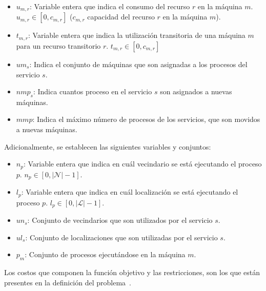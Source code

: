 \documentclass[../informe2.tex]{subfiles}
\begin{document}
\begin{itemize}
	\item $u_{m,r}$: Variable entera que indica el consumo del recurso $r$ en la máquina $m$. $u_{m,r} \in [0,c_{m,r}]$ ($c_{m,r}$ capacidad del recurso $r$ en la máquina $m$).
	\item $t_{m,r}$: Variable entera que indica la utilización transitoria de una máquina $m$ para un recurso transitorio $r$. $t_{m,r} \in [0,c_{m,r}]$
	\item $um_s$: Indica el conjunto de máquinas que son asignadas a los procesos del servicio $s$.
	\item $nmp_s$: Indica cuantos proceso en el servicio $s$ son asignados a nuevas máquinas.
	\item $mmp$: Indica el máximo número de procesos de los servicios, que son movidos a nuevas máquinas.
\end{itemize}
Adicionalmente, se establecen las siguientes variables y conjuntos:
\begin{itemize}
	\item $n_p$: Variable entera que indica en cuál vecindario se está ejecutando el proceso $p$. $n_p \in [0,|\mathcal{N}|-1]$.
	\item $l_p$: Variable entera que indica en cuál localización se está ejecutando el proceso $p$. $l_p \in [0,|\mathcal{L}|-1]$.
	\item $un_s$: Conjunto de vecindarios que son utilizados por el servicio $s$.
	\item $ul_s$: Conjunto de localizaciones que son utilizadas por el servicio $s$.
	\item $p_m$: Conjunto de procesos ejecutándose en la máquina $m$.
\end{itemize}
Los costos que componen la función objetivo y las restricciones, son los que están presentes en la definición del problema~\cite{2012ProblemDefinition}.
\end{document}
